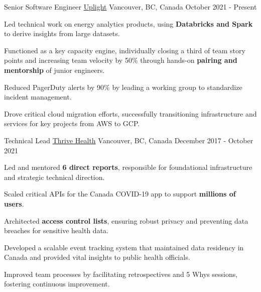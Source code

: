 

\begin{cventries}
\vspace{-0.3cm}

  \cventry
    {Senior Software Engineer} %
    {\href{https://uplight.com/}{Uplight}} %
    {Vancouver, BC, Canada} %
    {October 2021 - Present} %
    {
      \begin{cvitems} %
        \item{Led technical work on energy analytics products, using \textbf{Databricks and Spark} to derive insights from large datasets.}
        \item{Functioned as a key capacity engine, individually closing a third of team story points and increasing team velocity by 50\% through hands-on \textbf{pairing and mentorship} of junior engineers.}
        \item{Reduced PagerDuty alerts by 90\% by leading a working group to standardize incident management.}
        \item{Drove critical cloud migration efforts, successfully transitioning infrastructure and services for key projects from AWS to GCP.}
      \end{cvitems}
    }

  \cventry
    {Technical Lead} %
    {\href{https://www.thrive.health}{Thrive Health}} %
    {Vancouver, BC, Canada} %
    {December 2017 - October 2021} %
    {
      \begin{cvitems} %
        \item{Led and mentored \textbf{6 direct reports}, responsible for foundational infrastructure and strategic technical direction.}
        \item{Scaled critical APIs for the Canada COVID-19 app to support \textbf{millions of users}.}
        \item{Architected \textbf{access control lists}, ensuring robust privacy and preventing data breaches for sensitive health data.}
        \item{Developed a scalable event tracking system that maintained data residency in Canada and provided vital insights to public health officials.}
        \item{Improved team processes by facilitating retrospectives and 5 Whys sessions, fostering continuous improvement.}
      \end{cvitems}
    }


\end{cventries}
